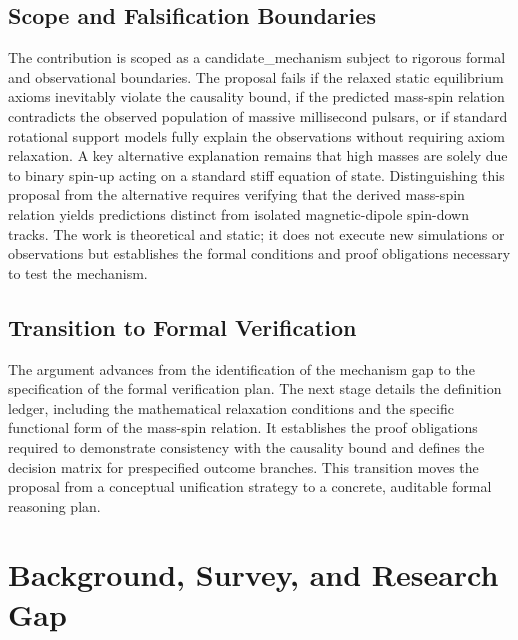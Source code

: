 \documentclass[conference]{IEEEtran}
\begin{document}
\subsection{Scope and Falsification Boundaries}
The contribution is scoped as a candidate\_mechanism subject to rigorous formal and observational boundaries. The proposal fails if the relaxed static equilibrium axioms inevitably violate the causality bound, if the predicted mass-spin relation contradicts the observed population of massive millisecond pulsars, or if standard rotational support models fully explain the observations without requiring axiom relaxation. A key alternative explanation remains that high masses are solely due to binary spin-up acting on a standard stiff equation of state. Distinguishing this proposal from the alternative requires verifying that the derived mass-spin relation yields predictions distinct from isolated magnetic-dipole spin-down tracks. The work is theoretical and static; it does not execute new simulations or observations but establishes the formal conditions and proof obligations necessary to test the mechanism.~\cite{cite_6c11517977d0b39d}

\subsection{Transition to Formal Verification}
The argument advances from the identification of the mechanism gap to the specification of the formal verification plan. The next stage details the definition ledger, including the mathematical relaxation conditions and the specific functional form of the mass-spin relation. It establishes the proof obligations required to demonstrate consistency with the causality bound and defines the decision matrix for prespecified outcome branches. This transition moves the proposal from a conceptual unification strategy to a concrete, auditable formal reasoning plan.

\section{Background, Survey, and Research Gap}
\end{document}
